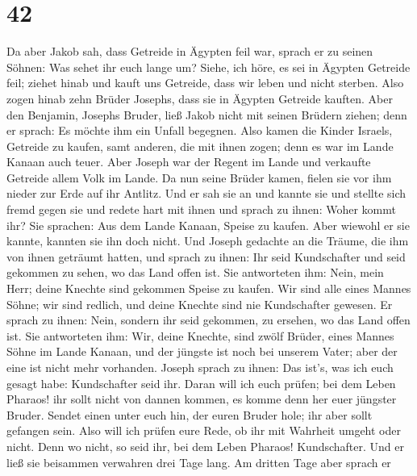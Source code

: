 \hypertarget{section-41}{%
\section{42}\label{section-41}}

 Da aber Jakob sah, dass Getreide in Ägypten feil war,
sprach er zu seinen Söhnen: Was sehet ihr euch lange um? 
Siehe, ich höre, es sei in Ägypten Getreide feil; ziehet hinab und kauft
uns Getreide, dass wir leben und nicht sterben.  Also
zogen hinab zehn Brüder Josephs, dass sie in Ägypten Getreide kauften.
 Aber den Benjamin, Josephs Bruder, ließ Jakob nicht mit
seinen Brüdern ziehen; denn er sprach: Es möchte ihm ein Unfall
begegnen.  Also kamen die Kinder Israels, Getreide zu
kaufen, samt anderen, die mit ihnen zogen; denn es war im Lande Kanaan
auch teuer.  Aber Joseph war der Regent im Lande und
verkaufte Getreide allem Volk im Lande. Da nun seine Brüder kamen,
fielen sie vor ihm nieder zur Erde auf ihr Antlitz.  Und
er sah sie an und kannte sie und stellte sich fremd gegen sie und redete
hart mit ihnen und sprach zu ihnen: Woher kommt ihr? Sie sprachen: Aus
dem Lande Kanaan, Speise zu kaufen.  Aber wiewohl er sie
kannte, kannten sie ihn doch nicht.  Und Joseph gedachte
an die Träume, die ihm von ihnen geträumt hatten, und sprach zu ihnen:
Ihr seid Kundschafter und seid gekommen zu sehen, wo das Land offen ist.
 Sie antworteten ihm: Nein, mein Herr; deine Knechte sind
gekommen Speise zu kaufen.  Wir sind alle eines Mannes
Söhne; wir sind redlich, und deine Knechte sind nie Kundschafter
gewesen.  Er sprach zu ihnen: Nein, sondern ihr seid
gekommen, zu ersehen, wo das Land offen ist.  Sie
antworteten ihm: Wir, deine Knechte, sind zwölf Brüder, eines Mannes
Söhne im Lande Kanaan, und der jüngste ist noch bei unserem Vater; aber
der eine ist nicht mehr vorhanden.  Joseph sprach zu
ihnen: Das ist's, was ich euch gesagt habe: Kundschafter seid ihr.
 Daran will ich euch prüfen; bei dem Leben Pharaos! ihr
sollt nicht von dannen kommen, es komme denn her euer jüngster Bruder.
 Sendet einen unter euch hin, der euren Bruder hole; ihr
aber sollt gefangen sein. Also will ich prüfen eure Rede, ob ihr mit
Wahrheit umgeht oder nicht. Denn wo nicht, so seid ihr, bei dem Leben
Pharaos! Kundschafter.  Und er ließ sie beisammen
verwahren drei Tage lang.  Am dritten Tage aber sprach er
